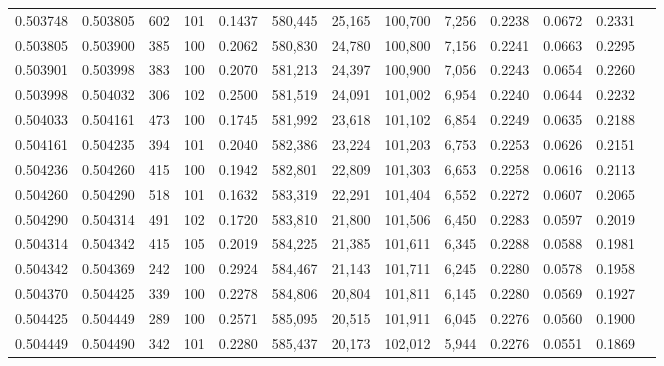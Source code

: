 \begin{tabular}{rrrrrrrrrrrrr}
0.503748 & 0.503805 &   602 & 101 &                                     0.1437 & 580,445 &  25,165 & 100,700 &   7,256 & 0.2238 & 0.0672 & 0.2331 \\
0.503805 & 0.503900 &   385 & 100 &                                     0.2062 & 580,830 &  24,780 & 100,800 &   7,156 & 0.2241 & 0.0663 & 0.2295 \\
0.503901 & 0.503998 &   383 & 100 &                                     0.2070 & 581,213 &  24,397 & 100,900 &   7,056 & 0.2243 & 0.0654 & 0.2260 \\
0.503998 & 0.504032 &   306 & 102 &                                     0.2500 & 581,519 &  24,091 & 101,002 &   6,954 & 0.2240 & 0.0644 & 0.2232 \\
0.504033 & 0.504161 &   473 & 100 &                                     0.1745 & 581,992 &  23,618 & 101,102 &   6,854 & 0.2249 & 0.0635 & 0.2188 \\
0.504161 & 0.504235 &   394 & 101 &                                     0.2040 & 582,386 &  23,224 & 101,203 &   6,753 & 0.2253 & 0.0626 & 0.2151 \\
0.504236 & 0.504260 &   415 & 100 &                                     0.1942 & 582,801 &  22,809 & 101,303 &   6,653 & 0.2258 & 0.0616 & 0.2113 \\
0.504260 & 0.504290 &   518 & 101 &                                     0.1632 & 583,319 &  22,291 & 101,404 &   6,552 & 0.2272 & 0.0607 & 0.2065 \\
0.504290 & 0.504314 &   491 & 102 &                                     0.1720 & 583,810 &  21,800 & 101,506 &   6,450 & 0.2283 & 0.0597 & 0.2019 \\
0.504314 & 0.504342 &   415 & 105 &                                     0.2019 & 584,225 &  21,385 & 101,611 &   6,345 & 0.2288 & 0.0588 & 0.1981 \\
0.504342 & 0.504369 &   242 & 100 &                                     0.2924 & 584,467 &  21,143 & 101,711 &   6,245 & 0.2280 & 0.0578 & 0.1958 \\
0.504370 & 0.504425 &   339 & 100 &                                     0.2278 & 584,806 &  20,804 & 101,811 &   6,145 & 0.2280 & 0.0569 & 0.1927 \\
0.504425 & 0.504449 &   289 & 100 &                                     0.2571 & 585,095 &  20,515 & 101,911 &   6,045 & 0.2276 & 0.0560 & 0.1900 \\
0.504449 & 0.504490 &   342 & 101 &                                     0.2280 & 585,437 &  20,173 & 102,012 &   5,944 & 0.2276 & 0.0551 & 0.1869 \\

\end{tabular}
